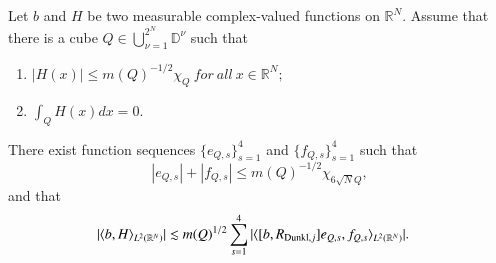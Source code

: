 \documentclass[12pt]{amsart}
\begin{document}
\begin{lemma}\label{NWOlemma}
Let $b$ and $H$ be two measurable complex-valued functions on $\mathbb{R}^N$. Assume that there is a cube ${\displaystyle Q\in \bigcup_{\nu=1}^{2^N}\mathbb{D}^\nu}$ such that
\begin{enumerate}
  \item ${\displaystyle|H(x)|\leq m(Q)^{-1/2}\chi_Q\ { for}\ { all}\  x\in\mathbb{R}^N;}$
  \item
${\displaystyle\int_{Q}H(x)dx=0}$.
\end{enumerate}
There exist function sequences $\{e_{Q,s}\}_{s=1}^4$ and $\{f_{Q,s}\}_{s=1}^4$ such that
$$|e_{Q,s}|+|f_{Q,s}|\leq m(Q)^{-1/2}\chi_{6\sqrt{N}Q},$$ and that
\begin{align}\label{yieldsss}
  |\langle b,H\rangle_{L^2(\mathbb{R}^N)}|&\lesssim m(Q)^{1/2}\sum_{s=1}^4|\langle [b,R_{{\rm Dunkl},j}]e_{Q,s},f_{Q,s}\rangle_{L^2(\mathbb{R}^N)}|.
\end{align}
\end{lemma}
\end{document}
